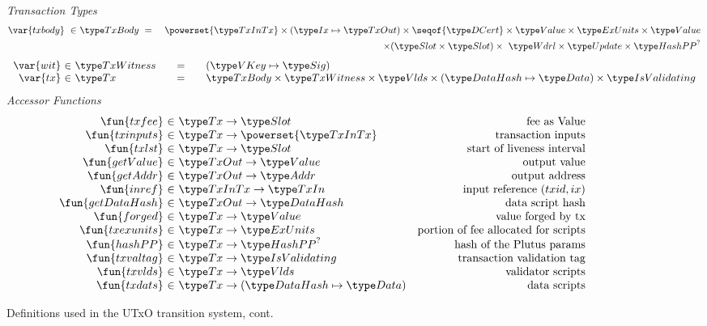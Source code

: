 \begin{figure*}[htb]
  \emph{Transaction Types}
  \begin{align*}
    \var{txbody} ~\in~
    & \TxBody ~=~
    & \powerset{\TxInTx} \times (\Ix \mapsto \TxOut) \times \seqof{\DCert}
      \times \Value \times \ExUnits \times \Value \\
    & ~& \times (\Slot\times\Slot) \times~ \Wdrl \times \Update \times \HashPP^?
  \end{align*}
  \begin{equation*}
    \begin{array}{r@{~\in~}l@{\qquad=\qquad}l}
      \var{wit} & \TxWitness & (\VKey \mapsto \Sig)
      \\
      \var{tx}
      & \Tx
      & \TxBody \times \TxWitness \times \Vlds \times (\HashDat \mapsto \Data)
      \times \IsValidating
    \end{array}
  \end{equation*}
  \emph{Accessor Functions}
  \begin{equation*}
    \begin{array}{r@{~\in~}lr}
      \fun{txfee} & \Tx \to \Slot & \text{fee as Value} \\
      \fun{txinputs} & \Tx \to \powerset{\TxInTx} & \text{transaction inputs} \\
      \fun{txlst} & \Tx \to \Slot & \text{start of liveness interval} \\
      \fun{getValue} & \TxOut \to \Value & \text{output value} \\
      \fun{getAddr} & \TxOut \to \Addr & \text{output address} \\
      \fun{inref} & \TxInTx \to \TxIn & \text{input reference $(txid,ix)$} \\
      \fun{getDataHash} & \TxOut \to \HashDat & \text{data script hash} \\
      \fun{forged} & \Tx \to \Value & \text{value forged by tx}\\
      \fun{txexunits} & \Tx \to \ExUnits & \text{portion of fee allocated for scripts}\\
      \fun{hashPP} & \Tx \to \HashPP^? & \text{hash of the Plutus params}\\
      \fun{txvaltag} & \Tx \to \IsValidating & \text{transaction validation tag}\\
      \fun{txvlds} & \Tx \to \Vlds & \text{validator scripts}\\
      \fun{txdats} & \Tx \to (\HashDat \mapsto \Data) & \text{data scripts}\\
    \end{array}
  \end{equation*}
  \caption{Definitions used in the UTxO transition system, cont.}
  \label{fig:defs:utxo-shelley-2}
\end{figure*}


